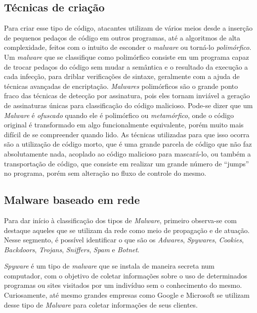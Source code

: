 \subsection{Técnicas de criação}
\label{ss.tecnicas}

Para criar esse tipo de código, atacantes utilizam de vários meios desde a
inserção de pequenos pedaços de código em outros programas, até a algoritmos
de alta complexidade, feitos com o intuito de esconder o \textit{malware} ou torná-lo
\emph{polimórfico}. Um \textit{malware} que se classifique como polimórfico consiste em
um programa capaz de trocar pedaços do código sem mudar a semântica e o
resultado da execução a cada infecção, para driblar verificações de sintaxe,
geralmente com a ajuda de técnicas avançadas de encriptação. \textit{Malwares}
polimórficos são o grande ponto fraco das técnicas de detecção por assinatura,
pois eles tornam inviável a geração de assinaturas únicas para classificação
do código malicioso. Pode-se dizer que um \textit{Malware} é \emph{ofuscado} quando ele é
polimórfico ou \emph{metamórfico}, onde o código original é transformado em
algo funcionalmente equivalente, porém muito mais difícil de se compreender
quando lido. As técnicas utilizadas para que isso ocorra são a utilização de
código morto, que é uma grande parcela de código que não faz absolutamente
nada, acoplado ao código malicioso para mascará-lo, ou também a transportação
de código, que consiste em realizar um grande número de ``jumps'' no programa,
porém sem alteração no fluxo de controle do mesmo.

\subsection{Malware baseado em rede}
\label{ss.malware_rede}

Para dar início à classificação dos tipos de \textit{Malware}, primeiro observa-se com
destaque aqueles que se utilizam da rede como meio de propagação e de atuação.
Nesse segmento, é possível identificar o que são os \textit{Adwares}, \textit{Spywares}, \textit{Cookies},
\textit{Backdoors}, \textit{Trojans}, \textit{Sniffers}, \textit{Spam} e \textit{Botnet}.

\textit{Spyware} é um tipo de \textit{malware} que se instala de maneira secreta num computador,
com o objetivo de coletar informações sobre o uso de determinados programas ou
sites visitados por um indivíduo sem o conhecimento do mesmo. Curiosamente,
até mesmo grandes empresas como Google e Microsoft se utilizam desse tipo de
\textit{Malware} para coletar informações de seus clientes.

